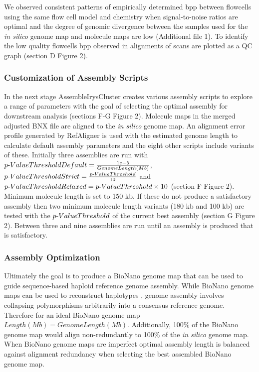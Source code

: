 \documentclass{bmcart}
\begin{document}
We observed consistent patterns of empirically determined bpp between flowcells using the same flow cell model and chemistry when signal-to-noise ratios are optimal and the degree of genomic divergence between the samples used for the \textit{in silico} genome map and molecule maps are low (Additional file 1). To identify the low quality flowcells bpp observed in alignments of scans are plotted as a QC graph (section D Figure 2). 

\subsubsection*{Customization of Assembly Scripts}

In the next stage AssembleIrysCluster creates various assembly scripts to explore a range of parameters with the goal of selecting the optimal assembly for downstream analysis (sections F-G Figure 2). Molecule maps in the merged adjusted BNX file are aligned to the \textit{in silico} genome map. An alignment error profile generated by RefAligner is used with the estimated genome length to calculate default assembly parameters and the eight other scripts include variants of these. Initially three assemblies are run with $p\textnormal{-}Value Threshold Default = \frac{1e-5}{Genome Length (Mb)}$, $p\textnormal{-}Value Threshold Strict = \frac{p\textnormal{-}Value Threshold}{10}$ and $p\textnormal{-}Value Threshold Relaxed = {p\textnormal{-}Value Threshold} \times {10}$ (section F Figure 2). Minimum molecule length is set to 150 kb. If these do not produce a satisfactory assembly then two minimum molecule length variants (180 kb and 100 kb) are tested with the $p\textnormal{-}Value Threshold$ of the current best assembly (section G Figure 2). Between three and nine assemblies are run until an assembly is produced that is satisfactory.

\subsubsection*{Assembly Optimization}

Ultimately the goal is to produce a BioNano genome map that can be used to guide sequence-based haploid reference genome assembly. While BioNano genome maps can be used to reconstruct haplotypes \cite{MHCLam}, genome assembly involves collapsing polymorphisms arbitrarily into a consensus reference genome. Therefore for an ideal BioNano genome map $Length (Mb) = Genome Length (Mb)$. Additionally, 100\% of the BioNano genome map would align non-redundantly to 100\% of the \textit{in silico} genome map. When BioNano genome maps are imperfect optimal assembly length is balanced against alignment redundancy when selecting the best assembled BioNano genome map.
\end{document}
